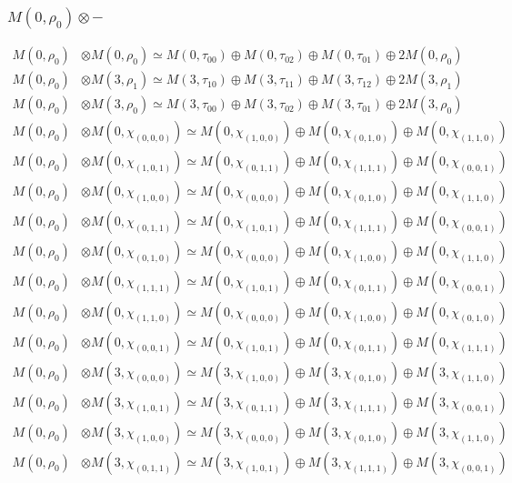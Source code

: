 \subsubsection{$ M(0,\rho_{0})\otimes -$}
\begin{align*}
M(0,\rho_{0}) &\otimes M(0,\rho_{0}) \simeq M(0,\tau_{00}) \oplus M(0,\tau_{02}) \oplus M(0,\tau_{01}) \oplus 2 M(0,\rho_{0})\\
M(0,\rho_{0}) &\otimes M(3,\rho_{1}) \simeq M(3,\tau_{10}) \oplus M(3,\tau_{11}) \oplus M(3,\tau_{12}) \oplus 2 M(3,\rho_{1})\\
M(0,\rho_{0}) &\otimes M(3,\rho_{0}) \simeq M(3,\tau_{00}) \oplus M(3,\tau_{02}) \oplus M(3,\tau_{01}) \oplus 2 M(3,\rho_{0})\\
M(0,\rho_{0}) &\otimes M(0,\chi_{(0,0,0)}) \simeq M(0,\chi_{(1,0,0)}) \oplus M(0,\chi_{(0,1,0)}) \oplus M(0,\chi_{(1,1,0)})\\
M(0,\rho_{0}) &\otimes M(0,\chi_{(1,0,1)}) \simeq M(0,\chi_{(0,1,1)}) \oplus M(0,\chi_{(1,1,1)}) \oplus M(0,\chi_{(0,0,1)})\\
M(0,\rho_{0}) &\otimes M(0,\chi_{(1,0,0)}) \simeq M(0,\chi_{(0,0,0)}) \oplus M(0,\chi_{(0,1,0)}) \oplus M(0,\chi_{(1,1,0)})\\
M(0,\rho_{0}) &\otimes M(0,\chi_{(0,1,1)}) \simeq M(0,\chi_{(1,0,1)}) \oplus M(0,\chi_{(1,1,1)}) \oplus M(0,\chi_{(0,0,1)})\\
M(0,\rho_{0}) &\otimes M(0,\chi_{(0,1,0)}) \simeq M(0,\chi_{(0,0,0)}) \oplus M(0,\chi_{(1,0,0)}) \oplus M(0,\chi_{(1,1,0)})\\
M(0,\rho_{0}) &\otimes M(0,\chi_{(1,1,1)}) \simeq M(0,\chi_{(1,0,1)}) \oplus M(0,\chi_{(0,1,1)}) \oplus M(0,\chi_{(0,0,1)})\\
M(0,\rho_{0}) &\otimes M(0,\chi_{(1,1,0)}) \simeq M(0,\chi_{(0,0,0)}) \oplus M(0,\chi_{(1,0,0)}) \oplus M(0,\chi_{(0,1,0)})\\
M(0,\rho_{0}) &\otimes M(0,\chi_{(0,0,1)}) \simeq M(0,\chi_{(1,0,1)}) \oplus M(0,\chi_{(0,1,1)}) \oplus M(0,\chi_{(1,1,1)})\\
M(0,\rho_{0}) &\otimes M(3,\chi_{(0,0,0)}) \simeq M(3,\chi_{(1,0,0)}) \oplus M(3,\chi_{(0,1,0)}) \oplus M(3,\chi_{(1,1,0)})\\
M(0,\rho_{0}) &\otimes M(3,\chi_{(1,0,1)}) \simeq M(3,\chi_{(0,1,1)}) \oplus M(3,\chi_{(1,1,1)}) \oplus M(3,\chi_{(0,0,1)})\\
M(0,\rho_{0}) &\otimes M(3,\chi_{(1,0,0)}) \simeq M(3,\chi_{(0,0,0)}) \oplus M(3,\chi_{(0,1,0)}) \oplus M(3,\chi_{(1,1,0)})\\
M(0,\rho_{0}) &\otimes M(3,\chi_{(0,1,1)}) \simeq M(3,\chi_{(1,0,1)}) \oplus M(3,\chi_{(1,1,1)}) \oplus M(3,\chi_{(0,0,1)})\\

\end{align*}
